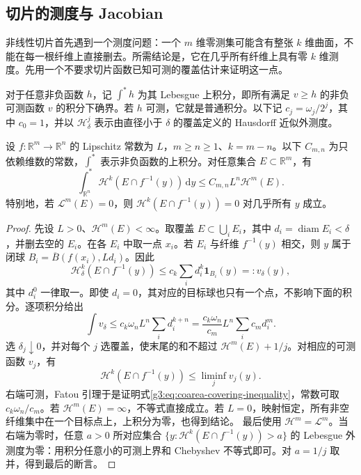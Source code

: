 \subsection{切片的测度与 Jacobian}
\label{g3:subsec:2004:02}
非线性切片首先遇到一个测度问题：一个 \(m\) 维零测集可能含有整张 \(k\) 维曲面，不能在每一根纤维上直接删去。所需结论是，它在几乎所有纤维上具有零 \(k\) 维测度。先用一个不要求切片函数已知可测的覆盖估计来证明这一点。

\ProseParagraphBreak

对于任意非负函数 \(h\)，记 \(\int^*h\) 为其 Lebesgue 上积分，即所有满足 \(v\ge h\) 的非负可测函数 \(v\) 的积分下确界。若 \(h\) 可测，它就是普通积分。以下记 \(c_j=\omega_j/2^j\)，其中 \(c_0=1\)，并以 \(\mathcal H^j_\delta\) 表示由直径小于 \(\delta\) 的覆盖定义的 Hausdorff 近似外测度。

\begin{lemma}\label{g3:lem:coarea-covering-inequality}
	设 \(f:\mathbb R^m\to\mathbb R^n\) 的 Lipschitz 常数为 \(L\)，\(m\ge n\ge1\)、\(k=m-n\)。以下 \(C_{m,n}\) 为只依赖维数的常数，\(\int^*\) 表示非负函数的上积分。对任意集合 \(E\subset\mathbb R^m\)，有
	\begin{equation}\label{g3:eq:coarea-covering-inequality}
		\int_{\mathbb R^n}^{*}\mathcal H^k(E\cap f^{-1}(y))\,\mathrm dy
		\le C_{m,n}L^n\mathcal H^m(E).
	\end{equation}
	特别地，若 \(\mathcal L^m(E)=0\)，则 \(\mathcal H^k(E\cap f^{-1}(y))=0\) 对几乎所有 \(y\) 成立。
\end{lemma}
\begin{proof}
	先设 \(L>0\)、\(\mathcal H^m(E)<\infty\)。取覆盖 \(E\subset\bigcup_iE_i\)，其中 \(d_i=\operatorname{diam}E_i<\delta\)，并删去空的 \(E_i\)。在各 \(E_i\) 中取一点 \(x_i\)。若 \(E_i\) 与纤维 \(f^{-1}(y)\) 相交，则 \(y\) 属于闭球 \(B_i=\overline B(f(x_i),Ld_i)\)。因此
	\[
		\mathcal H^k_\delta(E\cap f^{-1}(y))
		\le c_k\sum_i d_i^k\mathbf1_{B_i}(y)=:v_\delta(y),
	\]
	其中 \(d_i^0\) 一律取一。即使 \(d_i=0\)，其对应的目标球也只有一个点，不影响下面的积分。逐项积分给出
	\[
		\int v_\delta\le c_k\omega_nL^n\sum_i d_i^{k+n}
		=\frac{c_k\omega_n}{c_m}L^n\sum_i c_md_i^m.
	\]
	选 \(\delta_j\downarrow0\)，并对每个 \(j\) 选覆盖，使末尾的和不超过 \(\mathcal H^m(E)+1/j\)。对相应的可测函数 \(v_j\)，有
	\[
		\mathcal H^k(E\cap f^{-1}(y))
		\le\liminf_jv_j(y).
	\]
	右端可测，Fatou 引理于是证明式\eqref{g3:eq:coarea-covering-inequality}，常数可取 \(c_k\omega_n/c_m\)。若 \(\mathcal H^m(E)=\infty\)，不等式直接成立。若 \(L=0\)，映射恒定，所有非空纤维集中在一个目标点上，上积分为零，也得到结论。
	最后使用 \(\mathcal H^m=\mathcal L^m\)。当右端为零时，任意 \(a>0\) 所对应集合 \(\{y:\mathcal H^k(E\cap f^{-1}(y))>a\}\) 的 Lebesgue 外测度为零：用积分任意小的可测上界和 Chebyshev 不等式即可。对 \(a=1/j\) 取并，得到最后的断言。
\end{proof}

